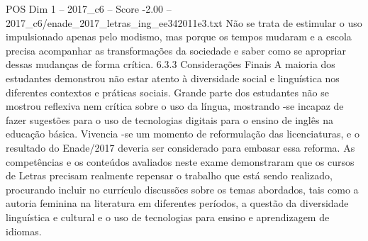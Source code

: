 \begin{textsample}{POS Dim 1 – 2017\_c6 – Score -2.00 – 2017\_c6/enade\_2017\_letras\_ing\_ee342011e3.txt}
Não se trata de estimular o uso impulsionado apenas pelo modismo, mas porque os tempos mudaram e a escola precisa acompanhar as transformações da sociedade e saber como se apropriar dessas mudanças de forma crítica. 6.3.3 Considerações Finais A maioria dos estudantes demonstrou não estar atento à diversidade social e linguística nos diferentes contextos e práticas sociais.
Grande parte dos estudantes não se mostrou reflexiva nem crítica sobre o uso da língua, mostrando -se incapaz de fazer sugestões para o uso de tecnologias digitais para o ensino de inglês na educação básica.
Vivencia -se um momento de reformulação das licenciaturas, e o resultado do Enade/2017 deveria ser considerado para embasar essa reforma.
As competências e os conteúdos avaliados neste exame demonstraram que os cursos de Letras precisam realmente repensar o trabalho que está sendo realizado, procurando incluir no currículo discussões sobre os temas abordados, tais como a autoria feminina na literatura em diferentes períodos, a questão da diversidade linguística e cultural e o uso de tecnologias para ensino e aprendizagem de idiomas.

\end{textsample}
